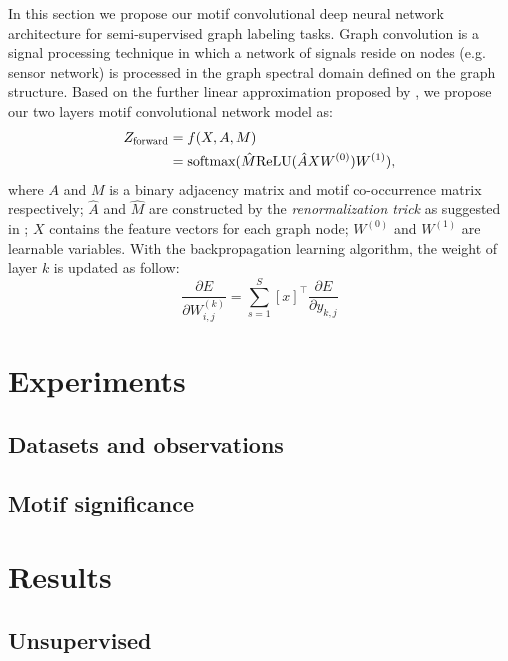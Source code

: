 \documentclass{article}
\theoremstyle{definition}
\begin{document}
In this section we propose our motif convolutional deep
neural network architecture for semi-supervised graph labeling
tasks. Graph convolution is a signal processing technique in which
a network of signals reside on nodes (e.g. sensor network) is
processed in the graph spectral domain defined on the graph structure.
 Based on the further linear approximation
proposed by \citeauthor{gcn}, we propose our two layers motif convolutional network
model as:
\begin{equation} \label{eq:2}
    \begin{aligned}
    Z_{\scalebox{0.75}{forward}} &= f(X,A,M) \\
    &= \mbox{softmax}(\hat{M} \mbox{ReLU}(\hat{A}XW^{(0)})W^{(1)}),
    \end{aligned}
\end{equation}
where $A$ and $M$ is a binary adjacency matrix and motif co-occurrence
matrix respectively; $\hat{A}$ and $\hat{M}$ are constructed by the
\emph{renormalization trick} as suggested in \cite{gcn}; $X$ contains
the feature vectors for each graph node; $W^{(0)}$ and $W^{(1)}$ are
learnable variables. With the backpropagation learning algorithm, the
weight of layer $k$ is updated as follow: 
\begin{equation}
\label{eq:3}
\frac{\partial E}{\partial W^{(k)}_{i,j}} = \sum^S_{s=1} [x]^\top \frac{\partial E}{\partial y_{k,j}}
\end{equation}

\section{Experiments}



\subsection{Datasets and observations}

\subsection{Motif significance}

\section{Results}

\subsection{Unsupervised}
\end{document}

